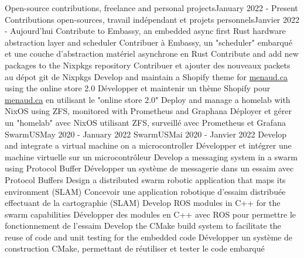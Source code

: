     \resumeSubHeadingListStart
        \resumeProjectHeadingEnFr
              {Open-source contributions, freelance and personal projects}{January 2022 - Present}
              {Contributions open-sources, travail indépendant et projets personnels}{Janvier 2022 - Aujourd’hui}
                \resumeItemListStart
                    \resumeItemEnFr
                        {Contribute to Embassy, an embedded async first Rust hardware abstraction layer and scheduler}
                        {Contribuer à Embassy, un "scheduler" embarqué et une couche d'abstraction matériel asynchrone en Rust}
                    \resumeItemEnFr
                        {Contribute and add new packages to the Nixpkgs repository}
                        {Contribuer et ajouter des nouveaux packets au dépot git de Nixpkgs}
                    \resumeItemEnFr
                        {Develop and maintain a Shopify theme for \href{https://menaud.ca/}{menaud.ca} using the online store 2.0}
                        {Développer et maintenir un thème Shopify pour \href{https://menaud.ca/}{menaud.ca} en utilisant le "online store 2.0"}
                    \resumeItemEnFr
                        {Deploy and manage a homelab with NixOS using ZFS, monitored with Prometheus and Graphana}
                        {Déployer et gérer un "homelab" avec NixOS utilisant ZFS, surveillé avec Prometheus et Grafana}
                \resumeItemListEnd
      \resumeProjectHeadingEnFr
          {SwarmUS}{May 2020 - January 2022}
          {SwarmUS}{Mai 2020 - Janvier 2022}
            \resumeItemListStart
                \resumeItemEnFr
                    {Develop and integrate a virtual machine on a microcontroller}
                    {Développer et intégrer une machine virtuelle sur un microcontrôleur}
                \resumeItemEnFr
                    {Develop a messaging system in a swarm using Protocol Buffer}
                    {Développer un système de messagerie dans un essaim avec Protocol Buffers}
                \resumeItemEnFr
                    {Design a distributed swarm robotic application that maps its environment (SLAM)}
                    {Concevoir une application robotique d’essaim distribuée effectuant de la cartographie (SLAM)}
                \resumeItemEnFr
                    {Develop ROS modules in C++ for the swarm capabilities}
                    {Développer des modules en C++ avec ROS pour permettre le fonctionnement de l’essaim}
                \resumeItemEnFr
                    {Develop the CMake build system to facilitate the reuse of code and unit testing for the embedded code}
                    {Développer un système de construction CMake, permettant de réutiliser et tester le code embarqué}
            \resumeItemListEnd
    \resumeSubHeadingListEnd

